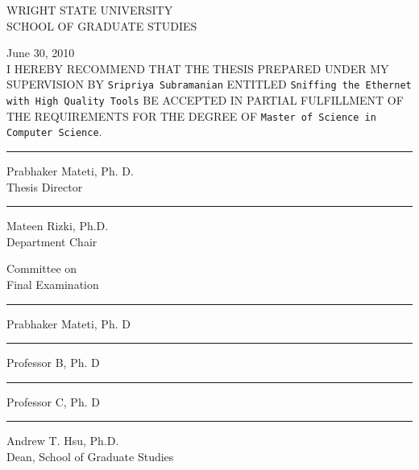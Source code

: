 \newpage
\thispagestyle{empty}

\begin{center}
WRIGHT STATE UNIVERSITY \\
SCHOOL OF GRADUATE STUDIES\\
\end{center}

\hfill
June 30, 2010\\			%

I HEREBY RECOMMEND THAT THE THESIS PREPARED UNDER MY SUPERVISION BY
{\tt Sripriya Subramanian}		%
ENTITLED
{\tt Sniffing the Ethernet with High Quality Tools} %
BE ACCEPTED IN PARTIAL FULFILLMENT OF THE
REQUIREMENTS FOR THE DEGREE OF
{\tt Master of Science in Computer Science}.\\


\hfill
\begin{minipage}{7cm}
\vskip 1cm\hrule\par\vskip 2mm
Prabhaker Mateti, Ph. D.\\	%
Thesis Director\\
\vskip 1cm\hrule\par\vskip 2mm
Mateen Rizki, Ph.D.\\
Department Chair\\
\end{minipage}

\vfill
\begin{minipage}{7cm}
Committee on\\
Final Examination\\
\vskip 1cm\hrule\par\vskip 2mm
Prabhaker Mateti, Ph. D\\	%
\vskip 1cm\hrule\par\vskip 2mm
Professor B, Ph. D\\		%
\vskip 1cm\hrule\par\vskip 2mm
Professor C, Ph. D\\		%
\vskip 1cm\hrule\par\vskip 2mm
Andrew T. Hsu, Ph.D.\\
Dean, School of Graduate Studies
\end{minipage}
